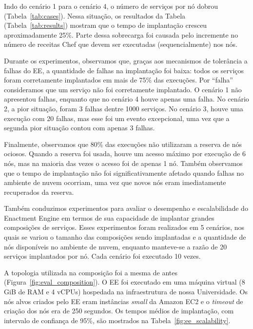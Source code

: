 Indo do cenário 1 para o cenário 4, o número de serviços por nó dobrou
(Tabela~\ref{tab:cases}). Nessa situação, os resultados da Tabela (Tabela~\ref{tab:results}) 
mostram que o tempo de implantação cresceu aproximadamente 25\%. Parte dessa sobrecarga foi causada
pelo incremente no número de receitas Chef que devem ser executadas (sequencialmente) nos nós.

Durante os experimentos, observamos que, graças aos mecanismos de tolerância a falhas do EE,
a quantidade de falhas na implantação foi baixa: todos os serviços foram corretamente implantados em mais
de 75\% das execuções.
Por ``falha'' consideramos que um serviço não foi corretamente implantado.
O cenário 1 não apresentou falhas,
enquanto que no cenário 4 houve apenas uma falha.
No cenário 2, a pior situação, foram 3 falhas dentre 1000 serviços.
No cenário 3, houve uma execução com 20 falhas, mas esse foi um evento excepcional,
uma vez que a segunda pior situação contou com apenas 3 falhas.


Finalmente, observamos que 80\% das execuções não utilizaram a reserva de nós ociosos.
Quando a reserva foi usada, houve um acesso máximo por execução de 6 nós,
mas na maioria das vezes o acesso foi de apenas 1 nó.
Também observamos que o tempo de implantação não foi significativamente afetado
quando falhas no ambiente de nuvem ocorriam,
uma vez que novos nós eram imediatamente recuperados da reserva.



Também conduzimos experimentos para avaliar o desempenho e escalabilidade do Enactment Engine
em termos de sua capacidade de implantar grandes composições de serviços.
Esses experimentos foram realizados em 5 cenários, nos quais se variou o tamanho das composições sendo implantadas
e a quantidade de nós disponíveis no ambiente de nuvem, enquanto manteve-se a razão de 20 serviços implantados por nó.
Cada cenário foi executado 10 vezes.

A topologia utilizada na composição foi a mesma de antes (Figura~\ref{fig:eval_composition}).
O EE foi executado em uma máquina virtual (8 GiB de RAM e 4 vCPUs)
hospedada na infraestrutura de nossa Universidade.
Os nós alvos criados pelo EE eram instâncias \emph{small} da Amazon EC2 e o \emph{timeout} de criação dos nós era de 250 segundos.
Os tempos médios de implantação, com intervalo de confiança de 95\%, são mostrados na Tabela~\ref{fig:ee_scalability}.

